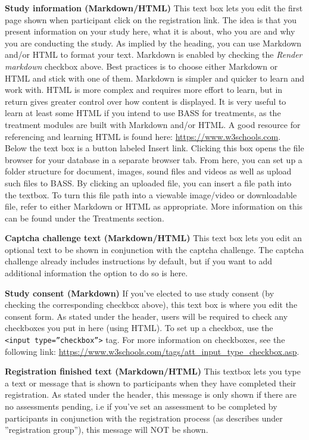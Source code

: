 \documentclass[
]{book}
\begin{document}
\textbf{Study information (Markdown/HTML)}
This text box lets you edit the first page shown when participant click on the registration link. The idea is that you present information on your study here, what it is about, who you are and why you are conducting the study.
As implied by the heading, you can use Markdown and/or HTML to format your text. Markdown is enabled by checking the \emph{Render markdown} checkbox above. Best practices is to choose either Markdown or HTML and stick with one of them. Markdown is simpler and quicker to learn and work with. HTML is more complex and requires more effort to learn, but in return gives greater control over how content is displayed.
It is very useful to learn at least some HTML if you intend to use BASS for treatments, as the treatment modules are built with Markdown and/or HTML.
A good resource for referencing and learning HTML is found here: \url{https://www.w3schools.com}.
Below the text box is a button labeled Insert link. Clicking this box opens the file browser for your database in a separate browser tab. From here, you can set up a folder structure for document, images, sound files and videos as well as upload such files to BASS. By clicking an uploaded file, you can insert a file path into the textbox. To turn this file path into a viewable image/video or downloadable file, refer to either Markdown or HTML as appropriate. More information on this can be found under the Treatments section.

\textbf{Captcha challenge text (Markdown/HTML)}
This text box lets you edit an optional text to be shown in conjunction with the captcha challenge. The captcha challenge already includes instructions by default, but if you want to add additional information the option to do so is here.

\textbf{Study consent (Markdown)}
If you've elected to use study consent (by checking the corresponding checkbox above), this text box is where you edit the consent form. As stated under the header, users will be required to check any checkboxes you put in here (using HTML). To set up a checkbox, use the \texttt{\textless{}input\ type=”checkbox”\textgreater{}} tag. For more information on checkboxes, see the following link: \url{https://www.w3schools.com/tags/att_input_type_checkbox.asp}.

\textbf{Registration finished text (Markdown/HTML)}
This textbox lets you type a text or message that is shown to participants when they have completed their registration. As stated under the header, this message is only shown if there are no assessments pending, i.e if you've set an assessment to be completed by participants in conjunction with the registration process (as describes under ''registration group''), this message will NOT be shown.
\end{document}

